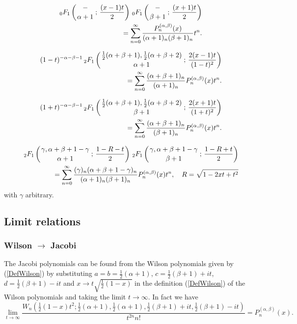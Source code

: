 \documentclass[envcountchap,graybox]{svmono}
\newcounter{rom}
\newcommand{\hyp}[5]{\mbox{}_{#1}{F}_{#2}
\left(\genfrac{}{}{0pt}{}{#3}{#4}\,;\,#5\right)}
\newcommand{\hyp}[5]{\,\mbox{}_{#1}F_{#2}\!\left(
  \genfrac{}{}{0pt}{}{#3}{#4};#5\right)}
\begin{document}
\begin{eqnarray}
\label{GenJacobi2}
& &\hyp{0}{1}{-}{\alpha+1}{\frac{(x-1)t}{2}}\,\hyp{0}{1}{-}{\beta+1}{\frac{(x+1)t}{2}}\nonumber\\
& &{}=\sum_{n=0}^{\infty}\frac{P_n^{(\alpha,\beta)}(x)}{(\alpha+1)_n(\beta+1)_n}t^n.
\end{eqnarray}

\begin{eqnarray}
\label{GenJacobi3}
& &(1-t)^{-\alpha-\beta-1}\,\hyp{2}{1}{\frac{1}{2}(\alpha+\beta+1),\frac{1}{2}(\alpha+\beta+2)}
{\alpha+1}{\frac{2(x-1)t}{(1-t)^2}}\nonumber\\
& &{}=\sum_{n=0}^{\infty}\frac{(\alpha+\beta+1)_n}{(\alpha+1)_n}P_n^{(\alpha,\beta)}(x)t^n.
\end{eqnarray}

\begin{eqnarray}
\label{GenJacobi4}
& &(1+t)^{-\alpha-\beta-1}\,\hyp{2}{1}{\frac{1}{2}(\alpha+\beta+1),\frac{1}{2}(\alpha+\beta+2)}
{\beta+1}{\frac{2(x+1)t}{(1+t)^2}}\nonumber\\
& &{}=\sum_{n=0}^{\infty}\frac{(\alpha+\beta+1)_n}{(\beta+1)_n}P_n^{(\alpha,\beta)}(x)t^n.
\end{eqnarray}

\begin{eqnarray}
\label{GenJacobi5}
& &\hyp{2}{1}{\gamma,\alpha+\beta+1-\gamma}{\alpha+1}{\frac{1-R-t}{2}}\,
\hyp{2}{1}{\gamma,\alpha+\beta+1-\gamma}{\beta+1}{\frac{1-R+t}{2}}\nonumber\\
& &{}=\sum_{n=0}^{\infty}
\frac{(\gamma)_n(\alpha+\beta+1-\gamma)_n}{(\alpha+1)_n(\beta+1)_n}P_n^{(\alpha,\beta)}(x)t^n,
\quad R=\sqrt{1-2xt+t^2}
\end{eqnarray}
with $\gamma$ arbitrary.

\subsection*{Limit relations}

\subsubsection*{Wilson $\rightarrow$ Jacobi}
The Jacobi polynomials can be found from the Wilson polynomials given by (\ref{DefWilson}) by
substituting $a=b=\frac{1}{2}(\alpha+1)$, $c=\frac{1}{2}(\beta+1)+it$,
$d=\frac{1}{2}(\beta+1)-it$ and $x\rightarrow t\sqrt{\frac{1}{2}(1-x)}$ in the
definition (\ref{DefWilson}) of the Wilson polynomials and taking the limit
$t\rightarrow\infty$. In fact we have
$$\lim_{t\rightarrow\infty}
\frac{W_n(\frac{1}{2}(1-x)t^2;\frac{1}{2}(\alpha+1),
\frac{1}{2}(\alpha+1),\frac{1}{2}(\beta+1)+it,\frac{1}{2}(\beta+1)-it)}
{t^{2n}n!}=P_n^{(\alpha,\beta)}(x).$$
\end{document}

